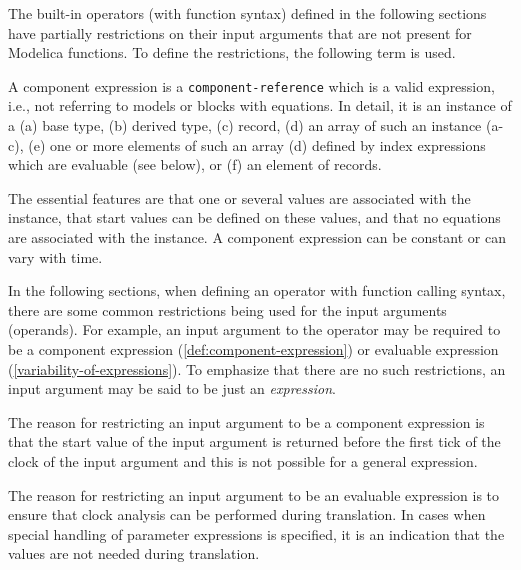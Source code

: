 The built-in operators (with function syntax) defined in the following sections have partially restrictions on their input arguments that are not present for Modelica functions.
To define the restrictions, the following term is used.

\begin{definition}\label{def:component-expression}
A component expression is a \lstinline[language=grammar]!component-reference! which is a valid expression, i.e., not referring to models or blocks with equations.
In detail, it is an instance of a (a) base type, (b) derived type, (c) record, (d) an array of such an instance (a-c), (e) one or more elements of such an array (d) defined by index expressions which are evaluable (see below), or (f) an element of records.
\begin{nonnormative}
The essential features are that one or several values are associated with the instance, that start values can be defined on these values, and that no equations are associated with the instance.
A component expression can be constant or can vary with time.
\end{nonnormative}
\end{definition}

In the following sections, when defining an operator with function calling syntax, there are some common restrictions being used for the input arguments (operands).
For example, an input argument to the operator may be required to be a component expression (\cref{def:component-expression}) or evaluable expression (\cref{variability-of-expressions}).
To emphasize that there are no such restrictions, an input argument may be said to be just an \emph{expression}.

\begin{nonnormative}
The reason for restricting an input argument to be a component expression is that the start value of the input argument is returned before the first tick of the clock of the input argument and this is not possible for a general expression.

The reason for restricting an input argument to be an evaluable expression is to ensure that clock analysis can be performed during translation.
In cases when special handling of parameter expressions is specified, it is an indication that the values are not needed during translation.
\end{nonnormative}

